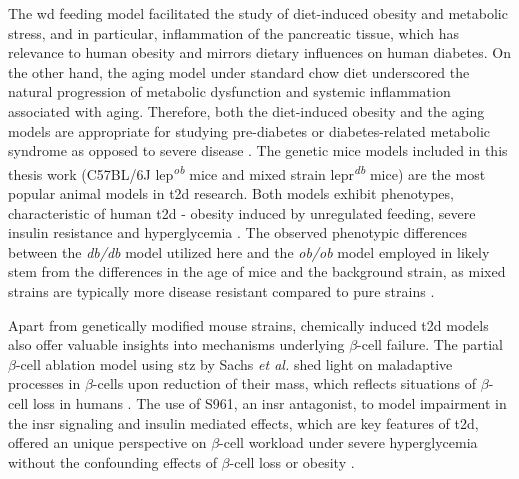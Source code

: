 \par The \gls{wd} feeding model facilitated the study of diet-induced obesity and metabolic stress, and in particular, inflammation of the pancreatic tissue, which has relevance to human obesity and mirrors dietary influences on human diabetes. On the other hand, the aging model under standard chow diet underscored the natural progression of metabolic dysfunction and systemic inflammation associated with aging. Therefore, both the diet-induced obesity and the aging models are appropriate for studying pre-diabetes or diabetes-related metabolic syndrome as opposed to severe disease \textbf{\cite{the_jackson_laboratory_choosing_nodate}}. The genetic mice models included in this thesis work (C57BL/6J \gls{lep}\textsuperscript{\textit{ob}} mice and mixed strain \gls{lepr}\textsuperscript{\textit{db}} mice) are the most popular animal models in \gls{t2d} research. Both models exhibit phenotypes, characteristic of human \gls{t2d} - obesity induced by unregulated feeding, severe insulin resistance and hyperglycemia \textbf{\cite{the_jackson_laboratory_choosing_nodate}}. The observed phenotypic differences between the \textit{db/db} model utilized here and the \textit{ob/ob} model employed in \textbf{\cite{chung_advances_2021}} likely stem from the differences in the age of mice and the background strain, as mixed strains are typically more disease resistant compared to pure strains \textbf{\cite{birchler_unraveling_2006}}.\\

\par Apart from genetically modified mouse strains, chemically induced \gls{t2d} models also offer valuable insights into mechanisms underlying $\beta$-cell failure. The partial $\beta$-cell ablation model using \gls{stz} by Sachs \textit{et al.} \textbf{\cite{sachs_targeted_2020}} shed light on maladaptive processes in $\beta$-cells upon reduction of their mass, which reflects situations of $\beta$-cell loss in humans \textbf{\cite{prentki_islet_2006}}. The use of S961, an \gls{insr} antagonist, to model impairment in the \gls{insr} signaling and insulin mediated effects, which are key features of \gls{t2d}, offered an unique perspective on $\beta$-cell workload under severe hyperglycemia without the confounding effects of $\beta$-cell loss or obesity \textbf{\cite{vikram_inhibition_2011}}.\\

